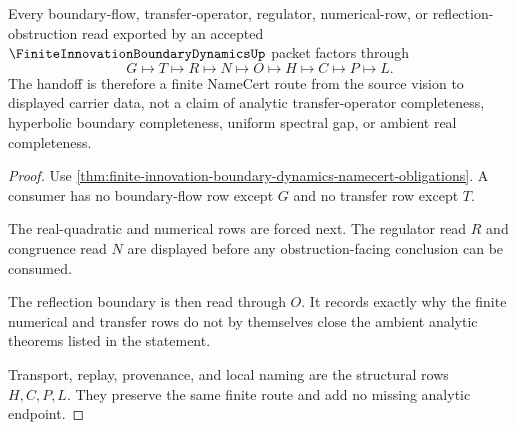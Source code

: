 \begin{theorem}
\label{thm:finite-innovation-boundary-dynamics-transfer-route}
Every boundary-flow, transfer-operator, regulator, numerical-row, or reflection-obstruction read exported by an accepted $\FiniteInnovationBoundaryDynamicsUp$ packet factors through
$$
G \longmapsto T \longmapsto R \longmapsto N \longmapsto O \longmapsto H \longmapsto C \longmapsto P \longmapsto L .
$$
The handoff is therefore a finite NameCert route from the source vision to displayed carrier data, not a claim of analytic transfer-operator completeness, hyperbolic boundary completeness, uniform spectral gap, or ambient real completeness.
\end{theorem}
\begin{proof}
Use \autoref{thm:finite-innovation-boundary-dynamics-namecert-obligations}. A consumer has no boundary-flow row except $G$ and no transfer row except $T$.

The real-quadratic and numerical rows are forced next. The regulator read $R$ and congruence read $N$ are displayed before any obstruction-facing conclusion can be consumed.

The reflection boundary is then read through $O$. It records exactly why the finite numerical and transfer rows do not by themselves close the ambient analytic theorems listed in the statement.

Transport, replay, provenance, and local naming are the structural rows $H,C,P,L$. They preserve the same finite route and add no missing analytic endpoint.
\end{proof}

